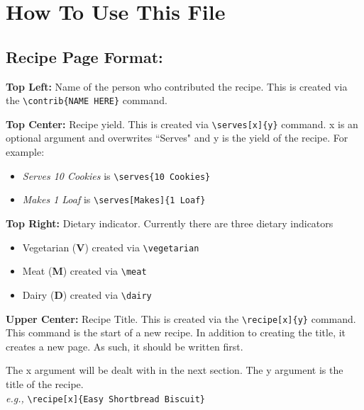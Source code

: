 
\lhead{}

\chapter*{How To Use This File}

\section*{Recipe Page Format:}

\textbf{Top Left:} Name of the person who contributed the recipe. This is created via the \verb|\contrib{NAME HERE}| command. \\
\vspace{.1 cm}

\noindent \textbf{Top Center:} Recipe yield. This is created via \verb|\serves[x]{y}| command. x is an optional argument and overwrites ``Serves" and y is the yield of the recipe. For example:
\begin{itemize}
    \item \textit{Serves 10 Cookies} is \verb|\serves{10 Cookies}|
    \item \textit{Makes 1 Loaf} is \verb|\serves[Makes]{1 Loaf}|
\end{itemize} 
\vspace{.1 cm}

\noindent \textbf{Top Right:} Dietary indicator. Currently there are three dietary indicators 
\begin{itemize}
    \item Vegetarian ({\large\color{vegcolor}\textbf{V}}) created via \verb|\vegetarian|
    \item Meat ({\large\color{meatcolor}\textbf{M}}) created via \verb|\meat|
    \item Dairy ({\large\color{dairy}\textbf{D}}) created via \verb|\dairy|
\end{itemize} 
\vspace{.1 cm}

\noindent \textbf{Upper Center:} Recipe Title. This is created via the \verb|\recipe[x]{y}| command. This command is the start of a new recipe. In addition to creating the title, it creates a new page. As such, it should be written first.
\par The x argument will be dealt with in the next section. The y argument is the title of the recipe. \\ \textit{e.g.,} \verb|\recipe[x]{Easy Shortbread Biscuit}| \\
\vspace{.1 cm}

